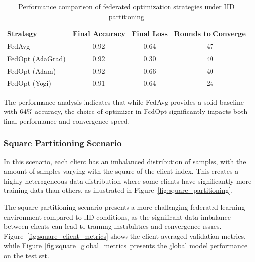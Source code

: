\documentclass[11pt]{article}
\begin{document}
    \begin{table}[h]
        \centering
        \caption{Performance comparison of federated optimization strategies under IID partitioning}
        \label{tab:iid_performance}
        \begin{tabular}{|l|c|c|c|}
            \hline
            \textbf{Strategy} & \textbf{Final Accuracy} & \textbf{Final Loss} & \textbf{Rounds to Converge} \\
            \hline
            FedAvg            & 0.92                    & 0.64                & 47                          \\
            FedOpt (AdaGrad)  & 0.92                    & 0.30                & 40                          \\
            FedOpt (Adam)     & 0.92                    & 0.66                & 40                          \\
            FedOpt (Yogi)     & 0.91                    & 0.64                & 24                          \\
            \hline
        \end{tabular}
    \end{table}

    The performance analysis indicates that while FedAvg provides a solid baseline with 64\% accuracy, the choice of optimizer in FedOpt significantly impacts both final performance and convergence speed.

    \subsubsection{Square Partitioning Scenario}
    \label{subsubsec:square-scenario}

    In this scenario, each client has an imbalanced distribution of samples, with the amount of samples varying with the square of the client index. This creates a highly heterogeneous data distribution where some clients have significantly more training data than others, as illustrated in Figure~\ref{fig:square_partitioning}.

    The square partitioning scenario presents a more challenging federated learning environment compared to IID conditions, as the significant data imbalance between clients can lead to training instabilities and convergence issues. Figure~\ref{fig:square_client_metrics} shows the client-averaged validation metrics, while Figure~\ref{fig:square_global_metrics} presents the global model performance on the test set.
\end{document}
